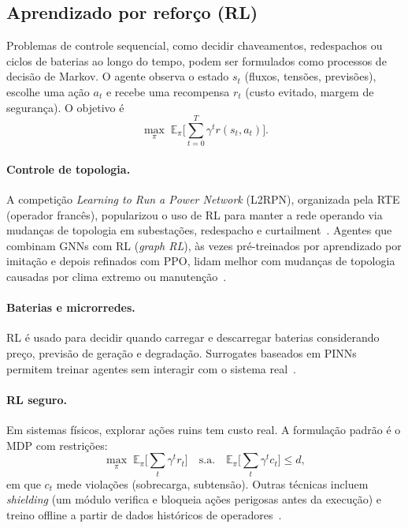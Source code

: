 \documentclass[10pt,a4paper,oneside]{article}
\begin{document}
\subsection{Aprendizado por reforço (RL)}

Problemas de controle sequencial, como decidir chaveamentos, redespachos ou
ciclos de baterias ao longo do tempo, podem ser formulados como processos de
decisão de Markov. O agente observa o estado $s_t$ (fluxos, tensões,
previsões), escolhe uma ação $a_t$ e recebe uma recompensa $r_t$ (custo
evitado, margem de segurança). O objetivo é
\begin{equation}
  \max_\pi \; \mathbb{E}_\pi\Big[\sum_{t=0}^{T} \gamma^t r(s_t, a_t)\Big].
\end{equation}

\paragraph{Controle de topologia.} A competição \textit{Learning to Run a
Power Network} (L2RPN), organizada pela RTE (operador francês), popularizou o
uso de RL para manter a rede operando via mudanças de topologia em
subestações, redespacho e curtailment~\cite{l2rpn}. Agentes que combinam GNNs
com RL (\textit{graph RL}), às vezes pré-treinados por aprendizado por
imitação e depois refinados com PPO, lidam melhor com mudanças de topologia
causadas por clima extremo ou manutenção~\cite{graphrlsurvey,ppognn}.

\paragraph{Baterias e microrredes.} RL é usado para decidir quando carregar e
descarregar baterias considerando preço, previsão de geração e degradação.
Surrogates baseados em PINNs permitem treinar agentes sem interagir com o
sistema real~\cite{rlpinn}.

\paragraph{RL seguro.} Em sistemas físicos, explorar ações ruins tem custo
real. A formulação padrão é o MDP com restrições:
\begin{equation}
  \max_\pi \; \mathbb{E}_\pi\Big[\sum_t \gamma^t r_t\Big]
  \quad \text{s.a.} \quad
  \mathbb{E}_\pi\Big[\sum_t \gamma^t c_t\Big] \le d,
\end{equation}
em que $c_t$ mede violações (sobrecarga, subtensão). Outras técnicas incluem
\textit{shielding} (um módulo verifica e bloqueia ações perigosas antes da
execução) e treino offline a partir de dados históricos de operadores~\cite{saferl}.
\end{document}
